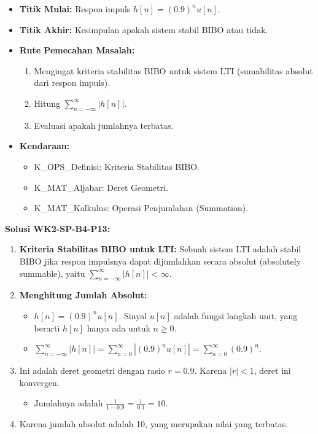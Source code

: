 \documentclass[
  letterpaper,
  DIV=11,
  numbers=noendperiod]{scrreprt}
\providecommand{\tightlist}{%
  \setlength{\itemsep}{0pt}\setlength{\parskip}{0pt}}
\begin{document}
\begin{itemize}
\tightlist
\item
  \textbf{Titik Mulai:} Respon impuls \(h[n] = (0.9)^n u[n]\).
\item
  \textbf{Titik Akhir:} Kesimpulan apakah sistem stabil BIBO atau tidak.
\item
  \textbf{Rute Pemecahan Masalah:}

  \begin{enumerate}
  \def\labelenumi{\arabic{enumi}.}
  \tightlist
  \item
    Mengingat kriteria stabilitas BIBO untuk sistem LTI (sumabilitas
    absolut dari respon impuls).
  \item
    Hitung \(\sum_{n=-\infty}^{\infty} |h[n]|\).
  \item
    Evaluasi apakah jumlahnya terbatas.
  \end{enumerate}
\item
  \textbf{Kendaraan:}

  \begin{itemize}
  \tightlist
  \item
    K\_OPS\_Definisi: Kriteria Stabilitas BIBO.
  \item
    K\_MAT\_Aljabar: Deret Geometri.
  \item
    K\_MAT\_Kalkulus: Operasi Penjumlahan (Summation).
  \end{itemize}
\end{itemize}

\textbf{Solusi WK2-SP-B4-P13:}

\begin{enumerate}
\def\labelenumi{\arabic{enumi}.}
\tightlist
\item
  \textbf{Kriteria Stabilitas BIBO untuk LTI:} Sebuah sistem LTI adalah
  stabil BIBO jika respon impulsnya dapat dijumlahkan secara absolut
  (absolutely summable), yaitu
  \(\sum_{n=-\infty}^{\infty} |h[n]| < \infty\).
\item
  \textbf{Menghitung Jumlah Absolut:}

  \begin{itemize}
  \tightlist
  \item
    \(h[n] = (0.9)^n u[n]\). Sinyal \(u[n]\) adalah fungsi langkah unit,
    yang berarti \(h[n]\) hanya ada untuk \(n \ge 0\).
  \item
    \(\sum_{n=-\infty}^{\infty} |h[n]| = \sum_{n=0}^{\infty} |(0.9)^n u[n]| = \sum_{n=0}^{\infty} (0.9)^n\).
  \end{itemize}
\item
  Ini adalah deret geometri dengan rasio \(r = 0.9\). Karena
  \(|r| < 1\), deret ini konvergen.

  \begin{itemize}
  \tightlist
  \item
    Jumlahnya adalah \(\frac{1}{1 - 0.9} = \frac{1}{0.1} = 10\).
  \end{itemize}
\item
  Karena jumlah absolut adalah 10, yang merupakan nilai yang terbatas.
\end{enumerate}
\end{document}
